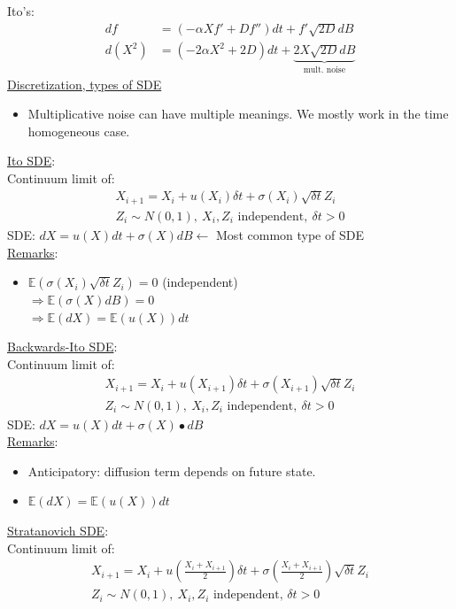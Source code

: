 \documentclass[12pt, letterpaper]{article}
\begin{document}
Ito's:
\begin{align*}
    df &= (-\alpha Xf'+Df'')dt + f'\sqrt{2D}dB \\
    d(X^2) &= (-2\alpha X^2+2D)dt + \underbrace{2X\sqrt{2D}dB}_{\text{mult. noise}}
\end{align*}
\underline{Discretization, types of SDE}
\begin{itemize}
    \item Multiplicative noise can have multiple meanings. We mostly work in the time homogeneous case.
\end{itemize}
\underline{Ito SDE}: \\
Continuum limit of: 
\begin{align*}
    X_{i+1} = X_i + u(X_i)\delta t + \sigma (X_i)\sqrt{\delta t}Z_i \\
    Z_i \sim N(0,1),\ X_i, Z_i \text{ independent},\ \delta t > 0 
\end{align*}
SDE: $dX = u(X)dt + \sigma(X)dB \leftarrow$ Most common type of SDE \\
\underline{Remarks}:
\begin{itemize}
    \item $\mathbb{E}(\sigma(X_i)\sqrt{\delta t}Z_i) = 0$ (independent) \\
    $\Rightarrow \mathbb{E}(\sigma(X)dB) = 0$\\
    $\Rightarrow \mathbb{E}(dX) = \mathbb{E}(u(X))dt$  
\end{itemize}
\underline{Backwards-Ito SDE}: \\
Continuum limit of: 
\begin{align*}
    X_{i+1} = X_i + u(X_{i+1})\delta t + \sigma (X_{i+1}) \sqrt{\delta t} Z_i \\
    Z_i \sim N(0,1),\ X_i, Z_i \text{ independent},\ \delta t > 0
\end{align*}
SDE: $dX = u(X)dt + \sigma(X)\bullet dB$ \\
\underline{Remarks}:
\begin{itemize}
    \item Anticipatory: diffusion term depends on future state.
    \item $\mathbb{E}(dX) = \mathbb{E}(u(X))dt$
\end{itemize}
\underline{Stratanovich SDE}: \\
Continuum limit of:
\begin{align*}
    X_{i+1} = X_i + u(\frac{X_i + X_{i+1}}{2})\delta t + \sigma(\frac{X_i + X_{i+1}}{2})\sqrt{\delta t} Z_i\\
    Z_i \sim N(0,1),\ X_i, Z_i \text{ independent, } \delta t > 0 
\end{align*}
\end{document}

